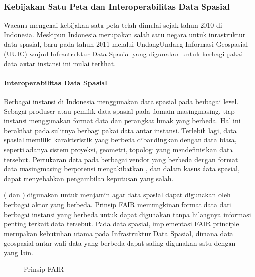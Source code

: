 \documentclass[letterpaper,10pt,english]{sphinxmanual}
\begin{document}
\subsubsection{Kebijakan Satu Peta dan Interoperabilitas Data Spasial}
\label{\detokenize{sesi3/interoperabilitas:kebijakan-satu-peta-dan-interoperabilitas-data-spasial}}
Wacana mengenai kebijakan satu peta telah dimulai sejak tahun 2010 di Indonesia. Meskipun Indonesia merupakan salah satu negara  untuk inrastruktur data spasial, baru pada tahun 2011 melalui Undang\sphinxhyphen{}Undang Informasi Geospasial (UUIG) wujud Infrastruktur Data Spasial yang digunakan untuk berbagi pakai data antar instansi ini mulai terlihat.


\paragraph{Interoperabilitas Data Spasial}
\label{\detokenize{sesi3/interoperabilitas:interoperabilitas-data-spasial}}
Berbagai instansi di Indonesia menggunakan data spasial pada berbagai level. Sebagai produser atau pemilik data spasial pada domain masing\sphinxhyphen{}masing, tiap instansi menggunakan format data dan perangkat lunak yang berbeda. Hal ini berakibat pada sulitnya berbagi pakai data antar instansi. Terlebih lagi, data spasial memiliki karakteristik yang berbeda dibandingkan dengan data biasa, seperti adanya sistem proyeksi, geometri, topologi yang mendefinisikan data tersebut. Pertukaran data pada berbagai vendor yang berbeda dengan format data masing\sphinxhyphen{}masing berpotensi mengakibatkan , dan dalam kasus data spasial, dapat menyebabkan pengambilan keputusan yang salah.

 ( dan ) digunakan untuk menjamin agar data spasial dapat digunakan oleh berbagai aktor yang berbeda. Prinsip FAIR memungkinan format data dari berbagai instansi yang berbeda untuk dapat digunakan tanpa hilangnya informasi penting terkait data tersebut. Pada data spasial, implementasi FAIR principle merupakan kebutuhan utama pada Infrastruktur Data Spasial, dimana data geospasial antar wali data yang berbeda dapat saling digunakan satu dengan yang lain.

\begin{figure}[htbp]
\centering
\capstart

\noindent{}
\caption{Prinsip FAIR}\label{\detokenize{sesi3/interoperabilitas:fairprinciple}}\end{figure}
\end{document}
